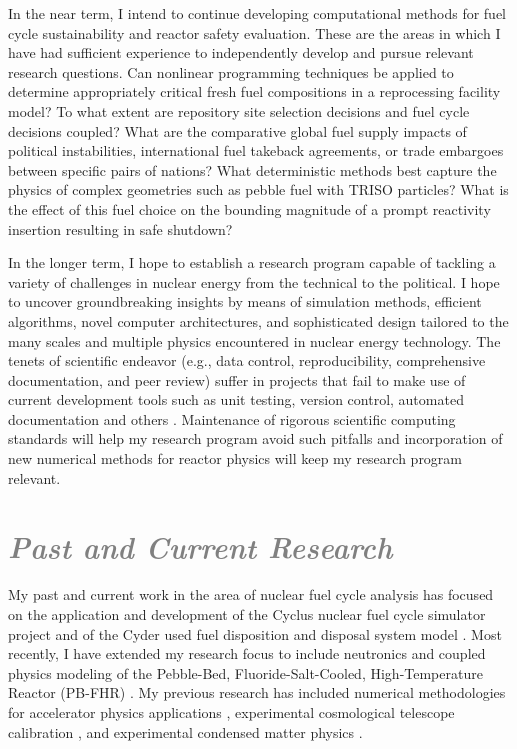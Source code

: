 \documentclass[a4paper, 10pt]{article}
\begin{document}
In the near term, I intend to continue developing computational methods for fuel 
cycle sustainability and reactor safety evaluation. These are the areas in which I 
have had sufficient experience to independently develop and pursue relevant 
research questions.  Can nonlinear programming techniques be applied to 
determine appropriately critical fresh fuel compositions in a reprocessing 
facility model? To what extent are repository site selection decisions and fuel 
cycle decisions coupled? What are the comparative global fuel supply impacts of 
political instabilities, international fuel takeback agreements, or
trade embargoes between specific pairs of nations?  What deterministic methods 
best capture the physics of complex geometries such as pebble fuel with TRISO 
particles? What is the effect of this fuel choice on the bounding magnitude of a 
prompt reactivity insertion resulting in safe shutdown? 

In the longer term, I hope to establish a research program capable of tackling a 
variety of challenges in nuclear energy from the technical to the political.  I 
hope to uncover groundbreaking insights by means of simulation methods, 
efficient algorithms, novel computer architectures, and sophisticated design 
tailored to the many scales and multiple physics encountered in nuclear energy 
technology.  The tenets of scientific endeavor (e.g., data control, 
reproducibility, comprehensive documentation, and peer review) suffer in 
projects that fail to make use of current development tools such as unit 
testing, version control, automated documentation and others 
\cite{wilson_best_2014, merali_computational_2010}. Maintenance of rigorous 
scientific computing standards will help my research program avoid such pitfalls 
\cite{huff_rapid_2011} and incorporation of new numerical methods for reactor 
physics will keep my research program relevant.

\section*{\textcolor{gray}{\it Past and Current Research}}

My past and current work in the area of nuclear fuel cycle analysis has focused 
on the application and development of the Cyclus nuclear fuel cycle simulator 
project \cite{cyclus_github_2011} and of the Cyder used fuel disposition and 
disposal system model \cite{cyder_github_2012, huff_integrated_2013}. Most 
recently, I have extended my research focus to include neutronics and coupled 
physics modeling of the Pebble-Bed, Fluoride-Salt-Cooled, High-Temperature 
Reactor (PB-FHR) \cite{facilitators_fluoride-salt-cooled_2013, 
facilitators_fluoride-salt-cooled_2013-1, 
facilitators_fluoride-salt-cooled_2013-2, 
facilitators_fluoride-salt-cooled_2013-3}.  My previous research has included 
numerical methodologies for accelerator physics applications 
\cite{huff_single_2003, huff_digital_2004}, experimental cosmological telescope 
calibration \cite{huff_celestial_2008}, and experimental condensed matter 
physics \cite{clerc_liquid_2008}. 
\end{document}
